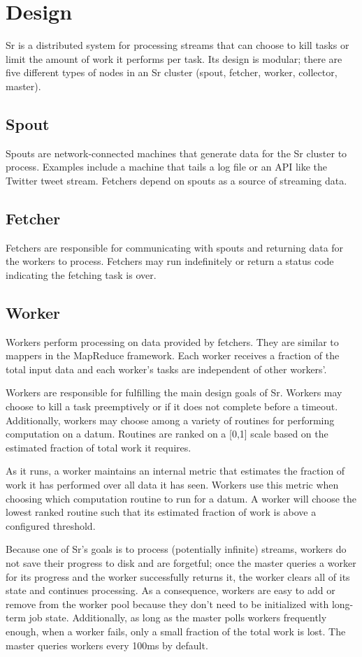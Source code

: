 \documentclass[12pt]{article}
\begin{document}
\section{Design}
\label{sec:design}
Sr is a distributed system for processing streams that can choose to kill tasks or
limit the amount of work it performs per task. Its design is modular; there are five
different types of nodes in an Sr cluster (spout, fetcher, worker, collector, master).
\subsection{Spout}
Spouts are network-connected machines that generate data for the Sr cluster to process.
Examples include a machine that tails a log file or an API like the Twitter tweet
stream. Fetchers depend on spouts as a source of streaming data.
\subsection{Fetcher}
Fetchers are responsible for communicating with spouts and returning data for the
workers to process. Fetchers may run indefinitely or return a status code indicating
the fetching task is over.
\subsection{Worker}
Workers perform processing on data provided by fetchers. They are similar to mappers
in the MapReduce framework. Each worker receives a fraction of the total input data
and each worker’s tasks are independent of other workers’.

Workers are responsible for fulfilling the main design goals of Sr. Workers may choose
to kill a task preemptively or if it does not complete before a timeout. Additionally,
workers may choose among a variety of routines for performing computation on a datum.
Routines are ranked on a [0,1] scale based on the estimated fraction of total work it
requires.

As it runs, a worker maintains an internal metric that estimates the fraction of work
it has performed over all data it has seen. Workers use this metric when choosing which
computation routine to run for a datum. A worker will choose the lowest ranked routine
such that its estimated fraction of work is above a configured threshold.

Because one of Sr’s goals is to process (potentially infinite) streams, workers do not
save their progress to disk and are forgetful; once the master queries a worker for its
progress and the worker successfully returns it, the worker clears all of its state and
continues processing. As a consequence, workers are easy to add or remove from the worker
pool because they don’t need to be initialized with long-term job state. Additionally, as
long as the master polls workers frequently enough, when a worker fails, only a small
fraction of the total work is lost. The master queries workers every 100ms by default.
\end{document}
